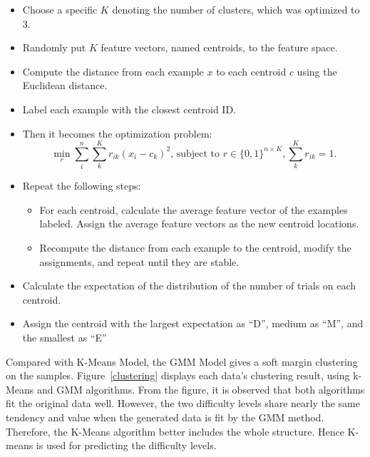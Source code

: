 \documentclass[12pt]{article}
\begin{document}
\begin{itemize}
    \item {Choose a specific $K$ denoting the number of clusters, which was optimized to $3$.}

    \item {Randomly put $K$ feature vectors, named centroids, to the feature space.}
    
    \item {Compute the distance from each example $x$ to each centroid $c$ using the Euclidean distance. }

    \item {Label each example with the closest centroid ID.}
    
    \item {Then it becomes the optimization problem:
    $$
    \min_r\sum^n_i\sum^K_kr_{ik}(x_i-c_k)^2 \text{, subject to } r\in\{0,1\}^{n\times K},\sum^K_kr_{ik}=1\text{.}
    $$
    }

    \item {Repeat the following steps:}

    \begin{itemize}
        \item {For each centroid, calculate the average feature vector of the examples labeled. Assign the average feature vectors as the new centroid locations.}

        \item {Recompute the distance from each example to the centroid, modify the assignments, and repeat until they are stable.}
    \end{itemize}

    \item {Calculate the expectation of the distribution of the number of trials on each centroid.}

    \item {Assign the centroid with the largest expectation as “D”, medium as “M”, and the smallest as “E”}
\end{itemize}

\vspace{0.3cm}
\noindent
Compared with K-Means Model, the GMM Model gives a soft margin clustering on the samples. Figure~\ref{clustering} displays each data's clustering result, using k-Means and GMM algorithms. From the figure, it is observed that both algorithms fit the original data well. However, the two difficulty levels share nearly the same tendency and value when the generated data is fit by the GMM method. Therefore, the K-Means algorithm better includes the whole structure. Hence K-means is used for predicting the difficulty levels.
\end{document}
